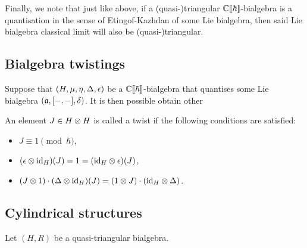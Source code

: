         Finally, we note that just like above, if a (quasi-)triangular $\mathbb{C}[\![\hbar]\!]$-bialgebra is a quantisation in the sense of Etingof-Kazhdan of some Lie bialgebra, then said Lie bialgebra classical limit will also be (quasi-)triangular.

    \subsection{Bialgebra twistings}
        Suppose that $(H, \mu, \eta, \Delta, \epsilon)$ be a $\mathbb{C}[\![\hbar]\!]$-bialgebra that quantises some Lie bialgebra $(\mathfrak{a}, [-, -], \delta)$. It is then possible obtain other 
        \begin{definition} \label{def: drinfeld_twists}
            An element $J \in H \tensor H$ is called a twist if the following conditions are satisfied:
            \begin{itemize}
                \item $J \equiv 1 \pmod{\hbar}$,
                \item $(\e \tensor \id_H)(J) = 1 = (\id_H \tensor \e)(J)$,
                \item $(J \tensor 1) \cdot (\Delta \tensor \id_H)(J) = (1 \tensor J) \cdot (\id_H \tensor \Delta)$.
            \end{itemize}
        \end{definition}

    \subsection{Cylindrical structures}
        \begin{definition} \label{def: cylindrical_bialgebras}
            Let $(H, R)$ be a quasi-triangular bialgebra. 
        \end{definition}